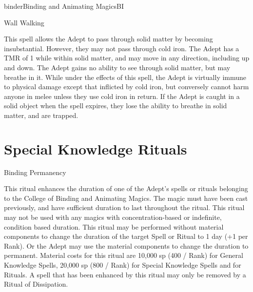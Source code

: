 \begin{College}[1.2]{binder}{Binding and Animating Magics}{BI}
\begin{spell}[S-13]{Wall Walking}
\begin{effects}
This spell allows the Adept to pass through solid matter by becoming
insubstantial.  However, they may not pass through cold iron.  The
Adept has a TMR of 1 while within solid matter, and may move in any
direction, including up and down. The Adept gains no ability to see
through solid matter, but may breathe in it.  While under the effects
of this spell, the Adept is virtually immune to physical damage except
that inflicted by cold iron, but conversely cannot harm anyone in
melee unless they use cold iron in return.  If the Adept is caught in
a solid object when the spell expires, they lose the ability to
breathe in solid matter, and are trapped.
\end{effects}
\end{spell}


\section{Special Knowledge Rituals}

\begin{ritual}[R-1]{Binding Permanency}

\begin{effects}
This ritual enhances the duration of one of the Adept’s spells or
rituals belonging to the College of Binding and Animating Magics. The
magic must have been cast previously, and have sufficient duration to
last throughout the ritual.  This ritual may not be used with any
magics with concentration-based or indefinite, condition based
duration.  This ritual may be performed without material components to
change the duration of the target Spell or Ritual to 1 day (+1 per
Rank).  Or the Adept may use the material components to change the
duration to permanent.  Material costs for this ritual are 10,000 sp
(400 / Rank) for General Knowledge Spells, 20,000 sp (800 / Rank) for
Special Knowledge Spells and for Rituals.  A spell that has been
enhanced by this ritual may only be removed by a Ritual of
Dissipation.
\end{effects}
\end{ritual}


\end{College}
